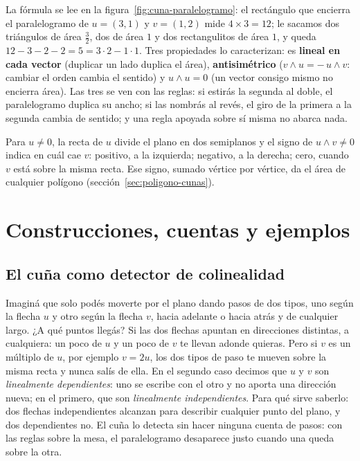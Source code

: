 La fórmula se lee en la figura~\ref{fig:cuna-paralelogramo}: el rectángulo que encierra el
paralelogramo de \(u=(3,1)\) y \(v=(1,2)\) mide \(4\times3=12\); le sacamos dos triángulos de
área \(\tfrac32\), dos de área \(1\) y dos rectangulitos de área \(1\), y queda
\(12-3-2-2=5=3\cdot2-1\cdot1\). Tres propiedades lo caracterizan: es \textbf{lineal en cada
vector} (duplicar un lado duplica el área), \textbf{antisimétrico} (\(v\wedge u=-\,u\wedge v\):
cambiar el orden cambia el sentido) y \(u\wedge u=0\) (un vector consigo mismo no encierra
área). Las tres se ven con las reglas: si estirás la segunda al doble, el paralelogramo
duplica su ancho; si las nombrás al revés, el giro de la primera a la segunda cambia de
sentido; y una regla apoyada sobre sí misma no abarca nada.

\begin{idea}
Para \(u\neq0\), la recta de \(u\) divide el plano en dos semiplanos y el signo de
\(u\wedge v\neq0\) indica en cuál cae \(v\): positivo, a la izquierda;
negativo, a la derecha; cero, cuando \(v\) está sobre la misma recta. Ese signo, sumado vértice por vértice, da
el área de cualquier polígono (sección~\ref{sec:poligono-cunas}).
\end{idea}


\section{Construcciones, cuentas y ejemplos}

\subsection{El cuña como detector de colinealidad}\label{sec:cuna-colinealidad}

Imaginá que solo podés moverte por el plano dando pasos de dos tipos, uno según la flecha
\(u\) y otro según la flecha \(v\), hacia adelante o hacia atrás y de cualquier largo. ¿A qué
puntos llegás?
Si las dos flechas apuntan en direcciones distintas, a cualquiera: un poco de \(u\) y un poco
de \(v\) te llevan adonde quieras. Pero si \(v\) es un múltiplo de \(u\), por ejemplo
\(v=2u\), los dos tipos de paso te mueven sobre la misma recta y nunca salís de ella. En el
segundo caso decimos que \(u\) y \(v\) son \emph{linealmente dependientes}: uno se escribe con
el otro y no aporta una dirección nueva; en el primero, que son \emph{linealmente
independientes}. Para qué sirve saberlo: dos flechas independientes alcanzan para describir
cualquier punto del plano, y dos dependientes no. El cuña lo detecta sin hacer ninguna
cuenta de pasos: con las reglas sobre la mesa, el paralelogramo desaparece justo cuando una
queda sobre la otra.

